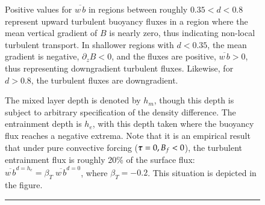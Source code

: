 \begin{figure}[h!t]
\begin{center}
{  \hspace{0.4cm}  Positive values for $\overline{w \, b}$  in regions between roughly $0.35 < d
  < 0.8$ represent upward turbulent buoyancy fluxes in a region where the mean vertical
  gradient of $B$ is nearly zero, thus indicating non-local turbulent transport.
  In shallower regions with $d < 0.35$, the mean gradient is negative,
  $\partial_{z} B < 0$, and the fluxes are positive, $\overline{w \,
    b} > 0$, thus representing downgradient turbulent fluxes.
  Likewise, for $d> 0.8$, the turbulent fluxes are downgradient.

  \hspace{0.4cm} The mixed layer depth is denoted by $h_{m}$, though
  this depth is subject to arbitrary specification of the density
  difference. The entrainment depth is $h_{e}$, with this depth taken
  where the buoyancy flux reaches a negative extrema. Note that it is
  an empirical result that under pure convective forcing ($\mbox{\boldmath $\tau$} =0,
  B_{f} < 0$), the turbulent entrainment flux is roughly 20\% of the
  surface flux: $\overline{w \, b}^{d=h_{e}} = \beta_{T} \;
  \overline{w \, b}^{d=0}$, where $\beta_{T} = -0.2$. This situation
  is depicted in the figure. }
\label{fig:kpp-figure1-reproduced}
\end{center}
\rule{\textwidth}{0.005in}
\end{figure}


